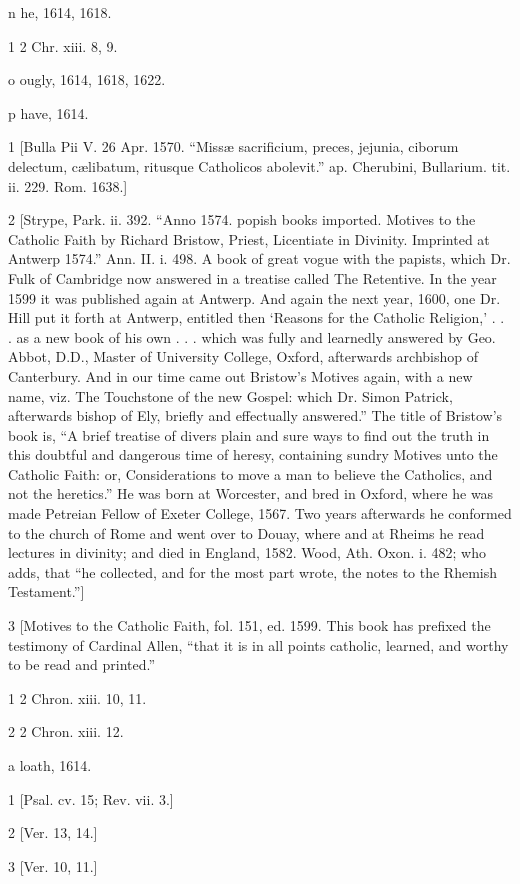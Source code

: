 n
he, 1614, 1618.

1
2 Chr. xiii. 8, 9.

o
ougly, 1614, 1618, 1622.

p
have, 1614.

1
[Bulla Pii V. 26 Apr. 1570. “Missæ sacrificium, preces, jejunia, ciborum delectum, cælibatum, ritusque Catholicos abolevit.” ap. Cherubini, Bullarium. tit. ii. 229. Rom. 1638.]

2
[Strype, Park. ii. 392. “Anno 1574. popish books imported. Motives to the Catholic Faith by Richard Bristow, Priest, Licentiate in Divinity. Imprinted at Antwerp 1574.” Ann. II. i. 498. A book of great vogue with the papists, which Dr. Fulk of Cambridge now answered in a treatise called The Retentive. In the year 1599 it was published again at Antwerp. And again the next year, 1600, one Dr. Hill put it forth at Antwerp, entitled then ‘Reasons for the Catholic Religion,’ . . . as a new book of his own . . . which was fully and learnedly answered by Geo. Abbot, D.D., Master of University College, Oxford, afterwards archbishop of Canterbury. And in our time came out Bristow’s Motives again, with a new name, viz. The Touchstone of the new Gospel: which Dr. Simon Patrick, afterwards bishop of Ely, briefly and effectually answered.” The title of Bristow’s book is, “A brief treatise of divers plain and sure ways to find out the truth in this doubtful and dangerous time of heresy, containing sundry Motives unto the Catholic Faith: or, Considerations to move a man to believe the Catholics, and not the heretics.” He was born at Worcester, and bred in Oxford, where he was made Petreian Fellow of Exeter College, 1567. Two years afterwards he conformed to the church of Rome and went over to Douay, where and at Rheims he read lectures in divinity; and died in England, 1582. Wood, Ath. Oxon. i. 482; who adds, that “he collected, and for the most part wrote, the notes to the Rhemish Testament.”]

3
[Motives to the Catholic Faith, fol. 151, ed. 1599. This book has prefixed the testimony of Cardinal Allen, “that it is in all points catholic, learned, and worthy to be read and printed.”

1
2 Chron. xiii. 10, 11.

2
2 Chron. xiii. 12.

a
loath, 1614.

1
[Psal. cv. 15; Rev. vii. 3.]

2
[Ver. 13, 14.]

3
[Ver. 10, 11.]

